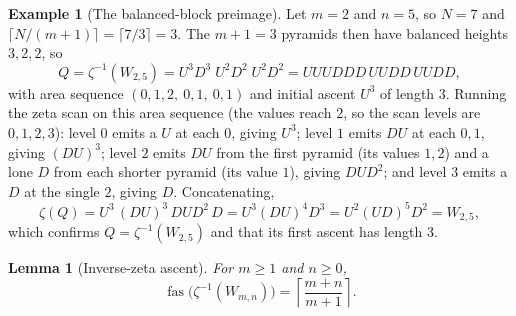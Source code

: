 \documentclass[11pt]{article}
\newtheorem{lemma}[theorem]{Lemma}
\theoremstyle{definition}
\newtheorem{example}[theorem]{Example}
\newcommand{\fas}{\operatorname{fas}}
\begin{document}
\begin{example}[The balanced-block preimage]
Let $m=2$ and $n=5$, so $N=7$ and $\lceil N/(m+1)\rceil=\lceil 7/3\rceil=3$.  The
$m+1=3$ pyramids then have balanced heights $3,2,2$, so
\[
   Q=\zeta^{-1}(W_{2,5})=U^3D^3\;U^2D^2\;U^2D^2
   =UUUDDD\,UUDD\,UUDD,
\]
with area sequence $(0,1,2,\ 0,1,\ 0,1)$ and initial ascent $U^3$ of length $3$.
Running the zeta scan on this area sequence (the values reach $2$, so the scan
levels are $0,1,2,3$): level $0$ emits a $U$ at each $0$, giving $U^3$; level $1$ emits
$DU$ at each $0,1$, giving $(DU)^3$; level $2$ emits $DU$ from the first pyramid
(its values $1,2$) and a lone $D$ from each shorter pyramid (its value $1$),
giving $DUD^2$; and level $3$ emits a $D$ at the single $2$, giving $D$.
Concatenating,
\[
   \zeta(Q)=U^3\,(DU)^3\,DUD^2\,D=U^3(DU)^4D^3=U^2(UD)^5D^2=W_{2,5},
\]
which confirms $Q=\zeta^{-1}(W_{2,5})$ and that its first ascent has length $3$.
\end{example}

\begin{lemma}[Inverse-zeta ascent]
\label{lem:inverse-zeta-fas}
For $m\ge 1$ and $n\ge 0$,
\[
   \fas\bigl(\zeta^{-1}(W_{m,n})\bigr)=\left\lceil\frac{m+n}{m+1}\right\rceil.
\]
\end{lemma}
\end{document}
